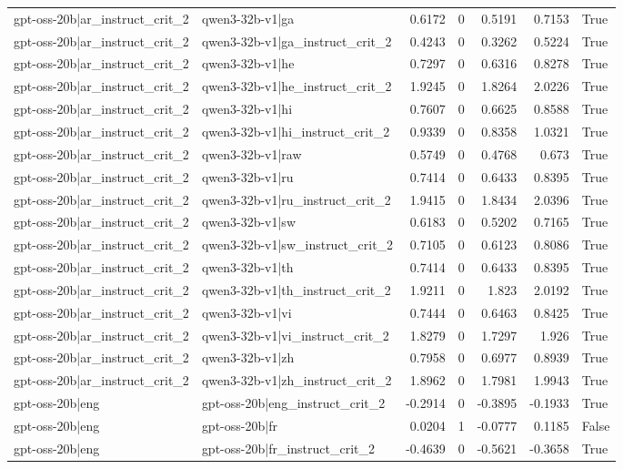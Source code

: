 \begin{table}
\begin{tabular}{l l r r r r l}
gpt-oss-20b|ar_instruct_crit_2 & qwen3-32b-v1|ga & 0.6172 & 0 & 0.5191 & 0.7153 & True \\
gpt-oss-20b|ar_instruct_crit_2 & qwen3-32b-v1|ga_instruct_crit_2 & 0.4243 & 0 & 0.3262 & 0.5224 & True \\
gpt-oss-20b|ar_instruct_crit_2 & qwen3-32b-v1|he & 0.7297 & 0 & 0.6316 & 0.8278 & True \\
gpt-oss-20b|ar_instruct_crit_2 & qwen3-32b-v1|he_instruct_crit_2 & 1.9245 & 0 & 1.8264 & 2.0226 & True \\
gpt-oss-20b|ar_instruct_crit_2 & qwen3-32b-v1|hi & 0.7607 & 0 & 0.6625 & 0.8588 & True \\
gpt-oss-20b|ar_instruct_crit_2 & qwen3-32b-v1|hi_instruct_crit_2 & 0.9339 & 0 & 0.8358 & 1.0321 & True \\
gpt-oss-20b|ar_instruct_crit_2 & qwen3-32b-v1|raw & 0.5749 & 0 & 0.4768 & 0.673 & True \\
gpt-oss-20b|ar_instruct_crit_2 & qwen3-32b-v1|ru & 0.7414 & 0 & 0.6433 & 0.8395 & True \\
gpt-oss-20b|ar_instruct_crit_2 & qwen3-32b-v1|ru_instruct_crit_2 & 1.9415 & 0 & 1.8434 & 2.0396 & True \\
gpt-oss-20b|ar_instruct_crit_2 & qwen3-32b-v1|sw & 0.6183 & 0 & 0.5202 & 0.7165 & True \\
gpt-oss-20b|ar_instruct_crit_2 & qwen3-32b-v1|sw_instruct_crit_2 & 0.7105 & 0 & 0.6123 & 0.8086 & True \\
gpt-oss-20b|ar_instruct_crit_2 & qwen3-32b-v1|th & 0.7414 & 0 & 0.6433 & 0.8395 & True \\
gpt-oss-20b|ar_instruct_crit_2 & qwen3-32b-v1|th_instruct_crit_2 & 1.9211 & 0 & 1.823 & 2.0192 & True \\
gpt-oss-20b|ar_instruct_crit_2 & qwen3-32b-v1|vi & 0.7444 & 0 & 0.6463 & 0.8425 & True \\
gpt-oss-20b|ar_instruct_crit_2 & qwen3-32b-v1|vi_instruct_crit_2 & 1.8279 & 0 & 1.7297 & 1.926 & True \\
gpt-oss-20b|ar_instruct_crit_2 & qwen3-32b-v1|zh & 0.7958 & 0 & 0.6977 & 0.8939 & True \\
gpt-oss-20b|ar_instruct_crit_2 & qwen3-32b-v1|zh_instruct_crit_2 & 1.8962 & 0 & 1.7981 & 1.9943 & True \\
gpt-oss-20b|eng & gpt-oss-20b|eng_instruct_crit_2 & -0.2914 & 0 & -0.3895 & -0.1933 & True \\
gpt-oss-20b|eng & gpt-oss-20b|fr & 0.0204 & 1 & -0.0777 & 0.1185 & False \\
gpt-oss-20b|eng & gpt-oss-20b|fr_instruct_crit_2 & -0.4639 & 0 & -0.5621 & -0.3658 & True \\

\end{tabular}
\end{table}
